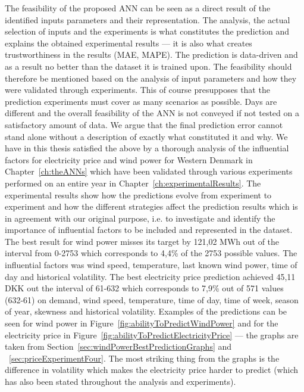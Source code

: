 The feasibility of the proposed ANN can be seen as a direct result of the identified inputs parameters and their representation. The analysis, the actual selection of inputs and the experiments is what constitutes the prediction and explains the obtained experimental results --- it is also what creates trustworthiness in the results (MAE, MAPE). The prediction is data-driven and as a result no better than the dataset it is trained upon. The feasibility should therefore be mentioned based on the analysis of input parameters and how they were validated through experiments. This of course presupposes that the prediction experiments must cover as many scenarios as possible. Days are different and the overall feasibility of the ANN is not conveyed if not tested on a satisfactory amount of data. We argue that the final prediction error cannot stand alone without a description of exactly what constituted it and why. We have in this thesis satisfied the above by a thorough analysis of the influential factors for electricity price and wind power for Western Denmark in Chapter~\ref{ch:theANNs} which have been validated through various experiments performed on an entire year in Chapter~\ref{ch:experimentalResults}. The experimental results show how the predictions evolve from experiment to experiment and how the different strategies affect the prediction results which is in agreement with our original purpose, i.e. to investigate and identify the importance of influential factors to be included and represented in the dataset. The best result for wind power misses its target by 121,02 MWh out of the interval from 0-2753 which corresponds to 4,4\% of the 2753 possible values. The influential factors was wind speed, temperature, last known wind power, time of day and historical volatility. The best electricity price prediction achieved 45,11 DKK out the interval of 61-632 which corresponds to 7,9\% out of 571 values (632-61) on demand, wind speed, temperature, time of day, time of week, season of year, skewness and historical volatility. Examples of the predictions can be seen for wind power in Figure~\ref{fig:abilityToPredictWindPower} and for the electricity price in Figure~\ref{fig:abilityToPredictElectricityPrice} --- the graphs are taken from Section~\ref{sec:windPowerBestPredictionGraphs} and ~\ref{sec:priceExperimentFour}. The most striking thing from the graphs is the difference in volatility which makes the electricity price harder to predict (which has also been stated throughout the analysis and experiments).

